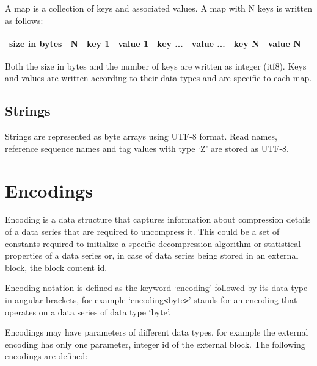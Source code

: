 \documentclass[a4paper]{article}
\begin{document}
A map is a collection of keys and associated values. A map with N keys is written 
as follows: 

\begin{tabular}{|l|l|l|l|l|l|l|l|}
\hline
size in bytes & N & key 1 & value 1 & key ... & value ... & key N & value N\tabularnewline
\hline
\end{tabular}

Both the size in bytes and the number of keys are written as integer (itf8). Keys 
and values are written according to their data types and are specific to each map.

\subsection{\textbf{Strings}}

Strings are represented as byte arrays using UTF-8 format. Read names, reference 
sequence names and tag values with type `Z' are stored as UTF-8.

\section{\textbf{Encodings }}

Encoding is a data structure that captures information about compression details 
of a data series that are required to uncompress it. This could be a set of constants 
required to initialize a specific decompression algorithm or statistical properties 
of a data series or, in case of data series being stored in an external block, 
the block content id. 

Encoding notation is defined as the keyword `encoding' followed by its data type 
in angular brackets, for example `encoding\texttt{<}byte\texttt{>}' stands for 
an encoding that operates on a data series of data type `byte'. 

Encodings may have parameters of different data types, for example the external 
encoding has only one parameter, integer id of the external block. The following 
encodings are defined: 
\end{document}
